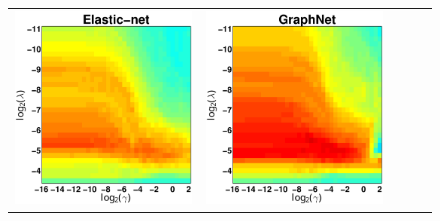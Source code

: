 \begin{figure}[ptbh]
\begin{tabular}{ccccc}
	\includegraphics[height=\imheight,width=\imwidth]{sim_gridsearch_enet_acc100.pdf} &
	\includegraphics[height=\imheight,width=\imwidth]{sim_gridsearch_gnet_acc100.pdf} &

\end{tabular}
\end{figure}
